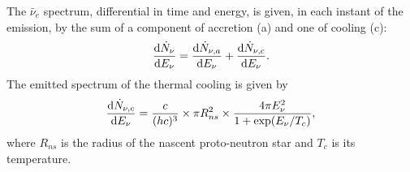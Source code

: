 \documentclass[a4paper,11pt]{article}
\newcommand*{\blu}{\textcolor{blue}}
\begin{document}

The $\bar \nu_e$ spectrum,
differential in time and energy, is given,  in each instant of the emission, by the sum of a component of accretion (a) and one of cooling (c):
\begin{equation}
    \dv{\dot{N}_{\nu}}{E_{\nu}}(E_{\nu},t)=\dv{\dot{N}_{\nu,a}}{E_{\nu}}(E_{\nu},t)+\dv{\dot{N}_{\nu,c}}{E_{\nu}}(E_{\nu},t).
\end{equation}
The emitted spectrum of the thermal cooling is given by \cite{sym13101851}
\begin{equation}\label{eq:spectrum_cooling}
\dv{\dot{N}_{\nu,c} }{E_{\nu}}(E_{\nu}, t) = \frac{c}{(hc)^3} \times \pi R^2_{ns} \times \frac{4 \pi E_{\nu}^2}{1 + \exp(E_{\nu}/T_c)} , 
\end{equation}
where $R_{ns}$ is the radius of the nascent proto-neutron star and $T_c$ is its temperature. %
\end{document}
